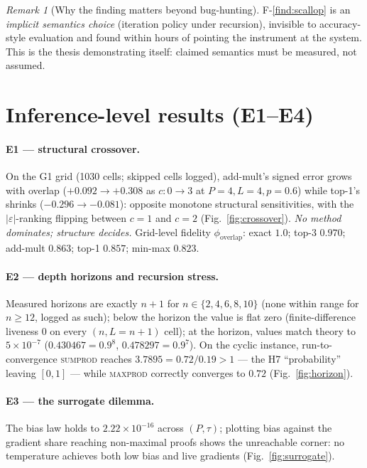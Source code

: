 \documentclass[10pt]{article}
\theoremstyle{remark}
\newtheorem{remark}{Remark}
\newcommand{\eps}{\varepsilon}
\begin{document}
\begin{remark}[Why the finding matters beyond bug-hunting]
F-\ref{find:scallop} is an \emph{implicit semantics choice} (iteration policy under recursion),
invisible to accuracy-style evaluation and found within hours of pointing the instrument at the
system. This is the thesis demonstrating itself: claimed semantics must be measured, not assumed.
\end{remark}

\section{Inference-level results (E1--E4)}\label{sec:inference}

\paragraph{E1 --- structural crossover.}
On the G1 grid (1030 cells; skipped cells logged), add-mult's signed error grows with overlap
($+0.092 \to +0.308$ as $c: 0\to3$ at $P{=}4, L{=}4, p{=}0.6$) while top-1's shrinks ($-0.296 \to
-0.081$): opposite monotone structural sensitivities, with the $\lvert\eps\rvert$-ranking flipping
between $c{=}1$ and $c{=}2$ (Fig.~\ref{fig:crossover}). \emph{No method dominates; structure
decides.} Grid-level fidelity $\phi_{\text{overlap}}$: exact $1.0$; top-3 $0.970$; add-mult
$0.863$; top-1 $0.857$; min-max $0.823$.

\paragraph{E2 --- depth horizons and recursion stress.}
Measured horizons are exactly $n{+}1$ for $n \in \{2,4,6,8,10\}$ (none within range for $n \ge
12$, logged as such); below the horizon the value is flat zero (finite-difference liveness $0$ on
every $(n, L{=}n{+}1)$ cell); at the horizon, values match theory to $5\times10^{-7}$ ($0.430467 =
0.9^8$, $0.478297 = 0.9^7$). On the cyclic instance, run-to-convergence \textsc{sumprod} reaches
$3.7895 = 0.72/0.19 > 1$ --- the H7 ``probability'' leaving $[0,1]$ --- while \textsc{maxprod}
correctly converges to $0.72$ (Fig.~\ref{fig:horizon}).

\paragraph{E3 --- the surrogate dilemma.}
The bias law holds to $2.22\times10^{-16}$ across $(P,\tau)$; plotting bias against the gradient
share reaching non-maximal proofs shows the unreachable corner: no temperature achieves both low
bias and live gradients (Fig.~\ref{fig:surrogate}).
\end{document}
